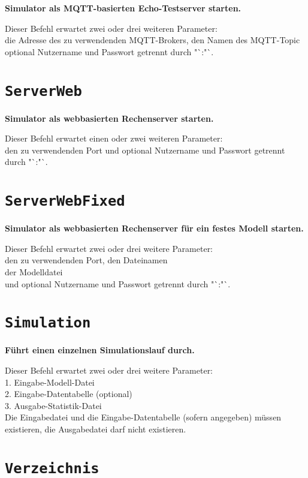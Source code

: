 \textbf{Simulator als MQTT-basierten Echo-Testserver starten.}

Dieser Befehl erwartet zwei oder drei weiteren Parameter:\\
die Adresse des zu verwendenden MQTT-Brokers, den Namen des MQTT-Topic optional Nutzername und Passwort getrennt durch "`:"`.

\section{\texttt{ServerWeb}}

\textbf{Simulator als webbasierten Rechenserver starten.}

Dieser Befehl erwartet einen oder zwei weiteren Parameter:\\
den zu verwendenden Port und optional Nutzername und Passwort getrennt durch "`:"`.

\section{\texttt{ServerWebFixed}}

\textbf{Simulator als webbasierten Rechenserver für ein festes Modell starten.}

Dieser Befehl erwartet zwei oder drei weitere Parameter:\\
den zu verwendenden Port, den Dateinamen\\
der Modelldatei\\
und optional Nutzername und Passwort getrennt durch "`:"`.

\section{\texttt{Simulation}}

\textbf{Führt einen einzelnen Simulationslauf durch.}

Dieser Befehl erwartet zwei oder drei weitere Parameter:\\
1. Eingabe-Modell-Datei\\
2. Eingabe-Datentabelle (optional)\\
3. Ausgabe-Statistik-Datei\\
Die Eingabedatei und die Eingabe-Datentabelle (sofern angegeben) müssen existieren, die Ausgabedatei darf nicht existieren.

\section{\texttt{Verzeichnis}}


